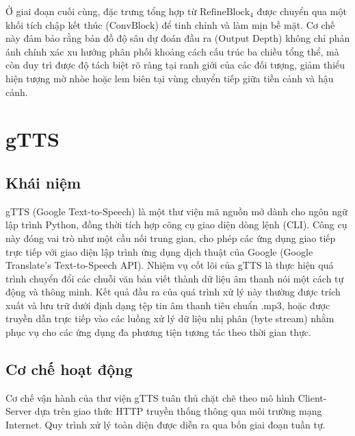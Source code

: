 Ở giai đoạn cuối cùng, đặc trưng tổng hợp từ $\text{RefineBlock}_4$ được chuyển qua một khối tích chập kết thúc ($\text{ConvBlock}$) để tinh chỉnh và làm mịn bề mặt. Cơ chế này đảm bảo rằng bản đồ độ sâu dự đoán đầu ra ($\text{Output Depth}$) không chỉ phản ánh chính xác xu hướng phân phối khoảng cách cấu trúc ba chiều tổng thể, mà còn duy trì được độ tách biệt rõ ràng tại ranh giới của các đối tượng, giảm thiểu hiện tượng mờ nhòe hoặc lem biên tại vùng chuyển tiếp giữa tiền cảnh và hậu cảnh.

\section{gTTS}

\subsection{Khái niệm}
gTTS (Google Text-to-Speech) là một thư viện mã nguồn mở dành cho ngôn ngữ lập trình Python, đồng thời tích hợp công cụ giao diện dòng lệnh (CLI). Công cụ này đóng vai trò như một cầu nối trung gian, cho phép các ứng dụng giao tiếp trực tiếp với giao diện lập trình ứng dụng dịch thuật của Google (Google Translate's Text-to-Speech API). Nhiệm vụ cốt lõi của gTTS là thực hiện quá trình chuyển đổi các chuỗi văn bản viết thành dữ liệu âm thanh nói một cách tự động và thông minh. Kết quả đầu ra của quá trình xử lý này thường được trích xuất và lưu trữ dưới định dạng tệp tin âm thanh tiêu chuẩn .mp3, hoặc được truyền dẫn trực tiếp vào các luồng xử lý dữ liệu nhị phân (byte stream) nhằm phục vụ cho các ứng dụng đa phương tiện tương tác theo thời gian thực.

\subsection{Cơ chế hoạt động}
Cơ chế vận hành của thư viện gTTS tuân thủ chặt chẽ theo mô hình Client-Server dựa trên giao thức HTTP truyền thống thông qua môi trường mạng Internet. Quy trình xử lý toàn diện được diễn ra qua bốn giai đoạn tuần tự. 

